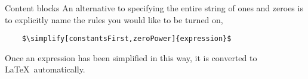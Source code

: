 \begin{chapter}{\label{cha:content_blocks}Content blocks}
  An alternative to specifying the entire string of ones and zeroes is to
  explicitly name the rules you would like to be turned on, \eg
  \begin{Verbatim}
    $\simplify[constantsFirst,zeroPower]{expression}$
  \end{Verbatim}
  Once an expression has been simplified in this way, it is converted to
  \LaTeX\ automatically.

\end{chapter}
